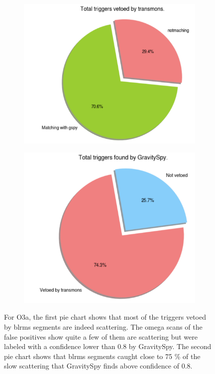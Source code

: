 \documentclass[12pt]{iopart}
\begin{document}
\begin{figure}[h]
   \centering
    \begin{subfigure}[b]{0.45\textwidth}
        \centering
         \includegraphics[width= \textwidth]{transmonvetoed.png}
         \caption{}
         \label{fig:transpie}
    \end{subfigure}
    \hfill
    \begin{subfigure}[b]{0.42\textwidth}
        \centering
         \includegraphics[width =\textwidth]{gspyvetoed.png}
         \caption{}
         \label{fig:gspypie}
         
    
    \end{subfigure}
    \caption{For O3a, the first pie chart shows that most of the triggers vetoed by  blrms segments are indeed scattering. The omega scans of the false positives show quite a few of them are scattering but were labeled with a confidence lower than 0.8 by GravitySpy. The second pie chart shows that blrms segments caught close to 75 \% of the slow scattering that GravitySpy finds above confidence of 0.8.}
    \label{fig:gspytrans}
    
\end{figure}
\par
\end{document}
